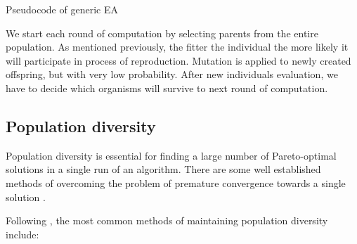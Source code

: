 \begin{algorithm}
 
  \BlankLine
  \initialise{\population} \;
  

  \caption{Pseudocode of generic EA}\label{pseudo_EA}
\end{algorithm}

We start each round of computation by selecting parents from the entire population.
As mentioned previously, the fitter the individual the more likely it will participate in process of reproduction.
Mutation is applied to newly created offspring, but with very low probability.
After new individuals evaluation, we have to decide which organisms will survive to next round of computation. 


\subsection{Population diversity}
\label{sec:population_diversity}

Population diversity is essential for finding a large number of Pareto-optimal solutions in a single run of an algorithm.
There are some well established methods of overcoming the problem of premature convergence towards a single solution \cite{Phd}. 

Following \cite{Phd}, the most common methods of maintaining population diversity include:

